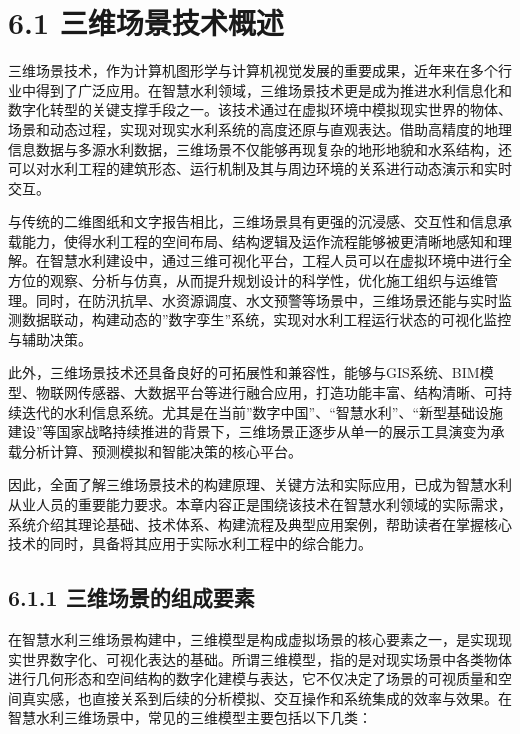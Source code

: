 \section{6.1
三维场景技术概述}\label{ux4e09ux7ef4ux573aux666fux6280ux672fux6982ux8ff0}

三维场景技术，作为计算机图形学与计算机视觉发展的重要成果，近年来在多个行业中得到了广泛应用。在智慧水利领域，三维场景技术更是成为推进水利信息化和数字化转型的关键支撑手段之一。该技术通过在虚拟环境中模拟现实世界的物体、场景和动态过程，实现对现实水利系统的高度还原与直观表达。借助高精度的地理信息数据与多源水利数据，三维场景不仅能够再现复杂的地形地貌和水系结构，还可以对水利工程的建筑形态、运行机制及其与周边环境的关系进行动态演示和实时交互。

与传统的二维图纸和文字报告相比，三维场景具有更强的沉浸感、交互性和信息承载能力，使得水利工程的空间布局、结构逻辑及运作流程能够被更清晰地感知和理解。在智慧水利建设中，通过三维可视化平台，工程人员可以在虚拟环境中进行全方位的观察、分析与仿真，从而提升规划设计的科学性，优化施工组织与运维管理。同时，在防汛抗旱、水资源调度、水文预警等场景中，三维场景还能与实时监测数据联动，构建动态的''数字孪生''系统，实现对水利工程运行状态的可视化监控与辅助决策。

此外，三维场景技术还具备良好的可拓展性和兼容性，能够与GIS系统、BIM模型、物联网传感器、大数据平台等进行融合应用，打造功能丰富、结构清晰、可持续迭代的水利信息系统。尤其是在当前''数字中国''、``智慧水利''、``新型基础设施建设''等国家战略持续推进的背景下，三维场景正逐步从单一的展示工具演变为承载分析计算、预测模拟和智能决策的核心平台。

因此，全面了解三维场景技术的构建原理、关键方法和实际应用，已成为智慧水利从业人员的重要能力要求。本章内容正是围绕该技术在智慧水利领域的实际需求，系统介绍其理论基础、技术体系、构建流程及典型应用案例，帮助读者在掌握核心技术的同时，具备将其应用于实际水利工程中的综合能力。

\subsection{6.1.1
三维场景的组成要素}\label{ux4e09ux7ef4ux573aux666fux7684ux7ec4ux6210ux8981ux7d20}

在智慧水利三维场景构建中，三维模型是构成虚拟场景的核心要素之一，是实现现实世界数字化、可视化表达的基础。所谓三维模型，指的是对现实场景中各类物体进行几何形态和空间结构的数字化建模与表达，它不仅决定了场景的可视质量和空间真实感，也直接关系到后续的分析模拟、交互操作和系统集成的效率与效果。在智慧水利三维场景中，常见的三维模型主要包括以下几类：

